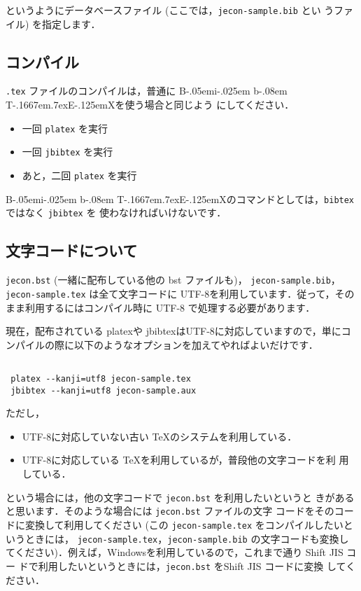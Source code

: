 \documentclass[a4j,10pt]{jarticle}
\def\BibTeX{{\rm B\kern-.05em{\sc i\kern-.025em b}\kern-.08em
    T\kern-.1667em\lower.7ex\hbox{E}\kern-.125emX}}
\begin{document}
というようにデータベースファイル (ここでは，\texttt{jecon-sample.bib} とい
うファイル) を指定します．

\subsection{コンパイル}

\texttt{.tex} ファイルのコンパイルは，普通に \BibTeX を使う場合と同じよう
にしてください．

\begin{itemize}
 \item 一回 \texttt{platex} を実行
 \item 一回 \texttt{jbibtex} を実行
 \item あと，二回 \texttt{platex} を実行
\end{itemize}

\BibTeX のコマンドとしては，\texttt{bibtex} ではなく \texttt{jbibtex} を
使わなければいけないです．

\subsection{文字コードについて}

\texttt{jecon.bst} (一緒に配布している他の bst ファイルも)，
\texttt{jecon-sample.bib}，\texttt{jecon-sample.tex} は全て文字コードに
UTF-8を利用しています．従って，そのまま利用するにはコンパイル時に UTF-8
で処理する必要があります．

現在，配布されている platexや jbibtexはUTF-8に対応していますので，単にコ
ンパイルの際に以下のようなオプションを加えてやればよいだけです．
\begin{screen}
 \begin{verbatim}

 platex --kanji=utf8 jecon-sample.tex
 jbibtex --kanji=utf8 jecon-sample.aux
 \end{verbatim}
\end{screen}

ただし，
\begin{itemize}
 \item UTF-8に対応していない古い \TeX のシステムを利用している．
 \item UTF-8に対応している \TeX を利用しているが，普段他の文字コードを利
       用している．
\end{itemize}
という場合には，他の文字コードで \texttt{jecon.bst} を利用したいというと
きがあると思います．そのような場合には \texttt{jecon.bst} ファイルの文字
コードをそのコードに変換して利用してください (この
\texttt{jecon-sample.tex} をコンパイルしたいというときには，
\texttt{jecon-sample.tex}，\texttt{jecon-sample.bib} の文字コードも変換し
てください)．例えば，Windowsを利用しているので，これまで通り Shift JIS コー
ドで利用したいというときには，\texttt{jecon.bst} をShift JIS コードに変換
してください．
\end{document}
